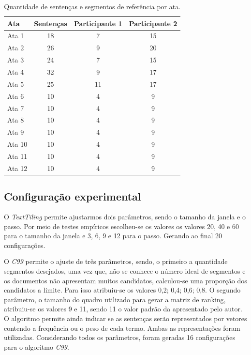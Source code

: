 \begin{table}[!h]
	\centering
	\begin{tabular}{|l|c|c|c|} \hline
		\textbf{Ata} & \textbf{Sentenças}  & 
		\textbf{Participante 1}  & 
		\textbf{Participante 2} \\	\hline

		Ata 1  & 18 & 7  & 15 \\ \hline 
		Ata 2  & 26 & 9  & 20 \\ \hline 
		Ata 3  & 24 & 7  & 15 \\ \hline 
		Ata 4  & 32 & 9  & 17 \\ \hline 
		Ata 5  & 25 & 11 & 17 \\ \hline 
		Ata 6  & 10 & 4  & 9  \\ \hline 
		Ata 7  & 10 & 4  & 9  \\ \hline 
		Ata 8  & 10 & 4  & 9  \\ \hline 
		Ata 9  & 10 & 4  & 9  \\ \hline 
		Ata 10 & 10 & 4  & 9  \\ \hline 
		Ata 11 & 10 & 4  & 9  \\ \hline 
		Ata 12 & 10 & 4  & 9  \\ \hline 

	\end{tabular}
	\caption{Quantidade de sentenças e segmentos de referência por ata.}
	\label{tab:segmentacaoreferencia}
\end{table}




\subsection{Configuração experimental}
\label{subsec:configuracaoexperimental}

  

O \textit{TextTiling} permite ajustarmos dois parâmetros, sendo o tamanho da janela e o passo. Por meio de testes empíricos escolheu-se os valores os valores 20, 40 e 60 para o tamanho da janela e 3, 6, 9 e 12 para o passo. Gerando ao final 20 configurações.
%

O \textit{C99} permite o ajuste de três parâmetros, sendo, o primeiro a quantidade segmentos desejados, uma vez que, não se conhece o número ideal de segmentos e os documentos não apresentam muitos candidatos, calculou-se uma proporção dos candidatos a limite. Para isso atribuiu-se os valores {0,2; 0,4; 0,6; 0,8}. O segundo parâmetro, o tamanho do quadro utilizado para gerar a matriz de ranking, atribuiu-se os valores 9 e 11, sendo 11 o valor padrão da apresentado pelo autor. O algoritmo permite ainda indicar se as sentenças serão representados por vetores contendo a frequência ou o peso de cada termo. Ambas as representações foram utilizadas. Considerando todos os parâmetros, foram geradas 16 configurações para o algoritmo \textit{C99}.





